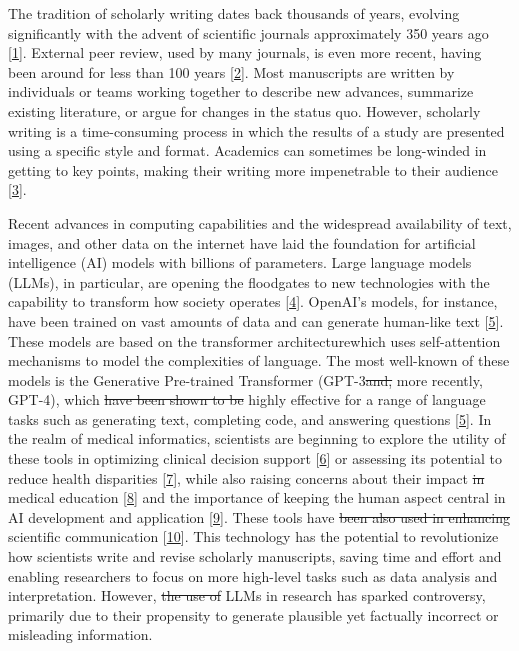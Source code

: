 \documentclass[
]{article}
\providecommand{\DIFaddtex}[1]{{\protect\color{blue}\uwave{#1}}} %
\providecommand{\DIFdeltex}[1]{{\protect\color{red}\sout{#1}}}                      %
\providecommand{\DIFaddbegin}{} %
\providecommand{\DIFaddend}{} %
\providecommand{\DIFdelbegin}{} %
\providecommand{\DIFdelend}{} %
\providecommand{\DIFadd}[1]{\texorpdfstring{\DIFaddtex{#1}}{#1}} %
\providecommand{\DIFdel}[1]{\texorpdfstring{\DIFdeltex{#1}}{}} %
\newcommand{\DIFscaledelfig}{0.5}
\newlength{\DIFdelgraphicswidth} %
\newlength{\DIFdelgraphicsheight} %
\newcommand{\DIFaddincludegraphics}[2][]{{\color{blue}\fbox{\DIFOincludegraphics[#1]{#2}}}} %
\newcommand{\DIFdelincludegraphics}[2][]{%
\sbox{\DIFdelgraphicsbox}{\DIFOincludegraphics[#1]{#2}}%
\settoboxwidth{\DIFdelgraphicswidth}{\DIFdelgraphicsbox} %
\settoboxtotalheight{\DIFdelgraphicsheight}{\DIFdelgraphicsbox} %
\scalebox{\DIFscaledelfig}{%
\parbox[b]{\DIFdelgraphicswidth}{\usebox{\DIFdelgraphicsbox}\\[-\baselineskip] \rule{\DIFdelgraphicswidth}{0em}}\llap{\resizebox{\DIFdelgraphicswidth}{\DIFdelgraphicsheight}{%
\setlength{\unitlength}{\DIFdelgraphicswidth}%
\begin{picture}(1,1)%
\thicklines\linethickness{2pt} %
{\color[rgb]{1,0,0}\put(0,0){\framebox(1,1){}}}%
{\color[rgb]{1,0,0}\put(0,0){\line( 1,1){1}}}%
{\color[rgb]{1,0,0}\put(0,1){\line(1,-1){1}}}%
\end{picture}%
}\hspace*{3pt}}} %
} %
\DeclareRobustCommand{\DIFaddbegin}{\DIFOaddbegin \let\includegraphics\DIFaddincludegraphics} %
\DeclareRobustCommand{\DIFaddend}{\DIFOaddend \let\includegraphics\DIFOincludegraphics} %
\DeclareRobustCommand{\DIFdelbegin}{\DIFOdelbegin \let\includegraphics\DIFdelincludegraphics} %
\DeclareRobustCommand{\DIFdelend}{\DIFOaddend \let\includegraphics\DIFOincludegraphics} %
\begin{document}
The tradition of scholarly writing dates back thousands of years, evolving significantly with the advent of scientific journals approximately 350 years ago {[}\protect\hyperlink{ref-F3iZfGUC}{1}{]}.
External peer review, used by many journals, is even more recent, having been around for less than 100 years {[}\protect\hyperlink{ref-1HMhNrQq1}{2}{]}.
Most manuscripts are written by individuals or teams working together to describe new advances, summarize existing literature, or argue for changes in the status quo.
However, scholarly writing is a time-consuming process in which the results of a study are presented using a specific style and format.
Academics can sometimes be long-winded in getting to key points, making their writing more impenetrable to their audience {[}\protect\hyperlink{ref-19YWsShi0}{3}{]}.

Recent advances in computing capabilities and the widespread availability of text, images, and other data on the internet have laid the foundation for artificial intelligence (AI) models with billions of parameters.
Large language models (LLMs), in particular, are opening the floodgates to new technologies with the capability to transform how society operates {[}\protect\hyperlink{ref-xq1uEbPa}{4}{]}.
OpenAI's models, for instance, have been trained on vast amounts of data and can generate human-like text {[}\protect\hyperlink{ref-bYOaJHMe}{5}{]}.
These models are based on the transformer architecture\DIFaddbegin \DIFadd{, }\DIFaddend which uses self-attention mechanisms to model the complexities of language.
The most well-known of these models is the Generative Pre-trained Transformer (GPT-3\DIFdelbegin \DIFdel{and, }\DIFdelend \DIFaddbegin \DIFadd{, and }\DIFaddend more recently, GPT-4), which \DIFdelbegin \DIFdel{have been shown to be }\DIFdelend \DIFaddbegin \DIFadd{is }\DIFaddend highly effective for a range of language tasks such as generating text, completing code, and answering questions {[}\protect\hyperlink{ref-bYOaJHMe}{5}{]}.
In the realm of medical informatics, scientists are beginning to explore the utility of these tools in optimizing clinical decision support {[}\protect\hyperlink{ref-gRhoGuC4}{6}{]} or assessing its potential to reduce health disparities {[}\protect\hyperlink{ref-CYB5vhZp}{7}{]}, while also raising concerns about their impact \DIFdelbegin \DIFdel{in }\DIFdelend \DIFaddbegin \DIFadd{on }\DIFaddend medical education {[}\protect\hyperlink{ref-h8wInPLE}{8}{]} and the importance of keeping the human aspect central in AI development and application {[}\protect\hyperlink{ref-Z2ek25Ak}{9}{]}.
These tools have \DIFdelbegin \DIFdel{been also used in enhancing }\DIFdelend \DIFaddbegin \DIFadd{also been used to enhance }\DIFaddend scientific communication {[}\protect\hyperlink{ref-Svww2RUh}{10}{]}.
This technology has the potential to revolutionize how scientists write and revise scholarly manuscripts, saving time and effort and enabling researchers to focus on more high-level tasks such as data analysis and interpretation.
However, \DIFdelbegin \DIFdel{the use of }\DIFdelend \DIFaddbegin \DIFadd{using }\DIFaddend LLMs in research has sparked controversy, primarily due to their propensity to generate plausible yet factually incorrect or misleading information.
\end{document}

